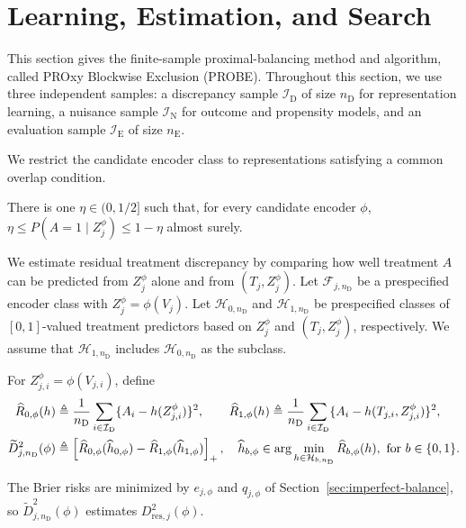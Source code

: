\section{Learning, Estimation, and Search}
\label{sec:learning-search}
\label{sec:estimation}

This section gives the finite-sample proximal-balancing method and algorithm, called PROxy Blockwise Exclusion (PROBE). Throughout this section, we use three independent samples: a discrepancy sample $\mathcal I_{\mathrm D}$ of size $n_{\mathrm D}$ for representation learning, a nuisance sample $\mathcal I_{\mathrm N}$ for outcome and propensity models, and an evaluation sample $\mathcal I_{\mathrm E}$ of size $n_{\mathrm E}$.

We restrict the candidate encoder class to representations satisfying a common overlap condition.

\begin{assumption}
\label{ass:library-overlap}
There is one $\eta\in(0,1/2]$ such that, for every candidate encoder $\phi$, $\eta\le P(A=1\mid Z_j^\phi)\le1-\eta$ almost surely.
\end{assumption}

We estimate residual treatment discrepancy by comparing how well treatment $A$ can be predicted from $Z_j^\phi$ alone and from $(T_j,Z_j^\phi)$. Let $\mathcal F_{j,n_{\mathrm D}}$ be a prespecified encoder class with $Z_j^\phi=\phi(V_j)$. Let $\mathcal H_{0,n_{\mathrm D}}$ and $\mathcal H_{1,n_{\mathrm D}}$ be prespecified classes of $[0,1]$-valued treatment predictors based on $Z_j^\phi$ and $(T_j,Z_j^\phi)$, respectively. We assume that $\mathcal H_{1,n_{\mathrm D}}$ includes $\mathcal H_{0,n_{\mathrm D}}$ as the subclass.

\begin{definition}
\label{def:empirical-held-out-proxy-discrepancy}
	For $Z_{j,i}^\phi=\phi(V_{j,i})$, define
	\begin{align}
		\widehat R_{0,\phi}(h) &\triangleq \frac{1}{n_{\mathrm D}} \sum_{i\in\mathcal I_{\mathrm D}} \{A_i-h(Z_{j,i}^\phi)\}^2, \qquad \widehat R_{1,\phi}(h) \triangleq \frac{1}{n_{\mathrm D}} \sum_{i\in\mathcal I_{\mathrm D}} \{A_i-h(T_{j,i},Z_{j,i}^\phi)\}^2, \notag\\
		\widetilde D_{j,n_{\mathrm D}}^2(\phi) &\triangleq \left[ \widehat R_{0,\phi}(\widehat h_{0,\phi}) - \widehat R_{1,\phi}(\widehat h_{1,\phi}) \right]_+ \label{eq:empirical-brier-fitting}, \quad \widehat h_{b,\phi}\in\arg\min_{h\in\mathcal H_{b,n_{\mathrm D}}}\widehat R_{b,\phi}(h), \text{ for }b\in\{0,1\}.
	\end{align}
	
\end{definition}
 The Brier risks are minimized by $e_{j,\phi}$ and $q_{j,\phi}$ of Section~\ref{sec:imperfect-balance}, so $\widetilde D_{j,n_{\mathrm D}}^2(\phi)$ estimates $D_{\mathrm{res},j}^2(\phi)$.

